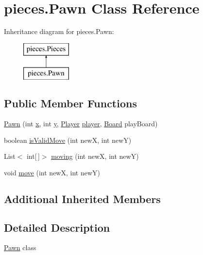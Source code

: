 \hypertarget{classpieces_1_1_pawn}{}\section{pieces.\+Pawn Class Reference}
\label{classpieces_1_1_pawn}
Inheritance diagram for pieces.\+Pawn\+:\begin{figure}[H]
\begin{center}
\leavevmode
\includegraphics[height=2.000000cm]{classpieces_1_1_pawn}
\end{center}
\end{figure}
\subsection*{Public Member Functions}
\begin{DoxyCompactItemize}
\item 
\mbox{\hyperlink{classpieces_1_1_pawn_ac5014277fafcc4556c3816123a353540}{Pawn}} (int \mbox{\hyperlink{classpieces_1_1_pieces_ac5178f9b8a6b0c4235851475081249f3}{x}}, int \mbox{\hyperlink{classpieces_1_1_pieces_a66d911734967a8ced1b9792fe900fadb}{y}}, \mbox{\hyperlink{classgame_1_1_player}{Player}} \mbox{\hyperlink{classpieces_1_1_pieces_a49f35044dd36e5c4b04261a8ea54ad0c}{player}}, \mbox{\hyperlink{classgame_1_1_board}{Board}} play\+Board)
\item 
boolean \mbox{\hyperlink{classpieces_1_1_pawn_a16fd663948369962794e5d278f3f8107}{is\+Valid\+Move}} (int newX, int newY)
\item 
List$<$ int\mbox{[}$\,$\mbox{]}$>$ \mbox{\hyperlink{classpieces_1_1_pawn_a2d97ee355c63d23a5ff0117ddf2a85b9}{moving}} (int newX, int newY)
\item 
void \mbox{\hyperlink{classpieces_1_1_pawn_ae20b1ede53cd4d2f6c1c064d05efaf93}{move}} (int newX, int newY)
\end{DoxyCompactItemize}
\subsection*{Additional Inherited Members}


\subsection{Detailed Description}
\mbox{\hyperlink{classpieces_1_1_pawn}{Pawn}} class 

